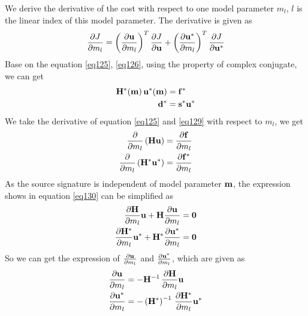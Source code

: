 \documentclass[revised,endfloat]{geophysics}
\begin{document}
We derive the derivative of the cost with respect to one model parameter $m_l$, $l$ is the linear index of this model parameter. The derivative is given as 
\begin{equation}
\frac{\partial J}{\partial m_l} = \left( \frac{\partial {\bf u}}{\partial m_l} \right)^T \frac{\partial J}{\partial {\bf u}} + \left( \frac{\partial {\bf u^*}}{\partial m_l} \right)^T \frac{\partial J}{\partial {\bf u^*}}
\label{eq128}
\end{equation}
Base on the equation \ref{eq125}, \ref{eq126}, using the property of complex conjugate, we can get
\begin{equation}
\begin{split}
{\bf H}^*({\bf m}) \, {\bf u}^*({\bf m})& = {\bf f}^* \\
{\bf d}^* &= {\bf s}^*{\bf u}^*
\end{split}
\label{eq129}
\end{equation}
We take the derivative of equation \ref{eq125} and \ref{eq129} with respect to $m_l$, we get 
\begin{equation}
\begin{split}
\frac{\partial }{\partial m_l} \left({\bf Hu} \right) &= \frac{\partial {\bf f}}{\partial m_l} \\
\frac{\partial }{\partial m_l} \left({\bf H}^* {\bf u}^* \right) &= \frac{\partial {\bf f}^*}{\partial m_l} \\
\end{split}
\label{eq130}
\end{equation}
As the source signature is independent of model parameter ${\bf m}$, the expression shows in equation \ref{eq130} can be simplified as
\begin{equation}
\begin{split}
\frac{\partial {\bf H}}{\partial m_l} {\bf u} + {\bf H} \frac{\partial {\bf u}}{\partial m_l}&= {\bf 0}\\
\frac{\partial {\bf H}^*}{\partial m_l} {\bf u}^* + {\bf H}^* \frac{\partial {\bf u}^*}{\partial m_l}&= {\bf 0}\\
\end{split}
\label{eq131}
\end{equation}
So we can get the expression of $\frac{\partial {\bf u}}{\partial m_l}$ and $\frac{\partial {\bf u}^*}{\partial m_l}$, which are given as 
\begin{equation}
\begin{split}
\frac{\partial {\bf u}}{\partial m_l}&= - {\bf H}^{-1} \,\frac{\partial {\bf H}}{\partial m_l} {\bf u} \\
\frac{\partial {\bf u}^*}{\partial m_l}&=  -\left({\bf H}^*\right)^{-1}  \, \frac{\partial {\bf H}^*}{\partial m_l} {\bf u}^*\\
\end{split}
\label{eq132}
\end{equation}
\end{document}
